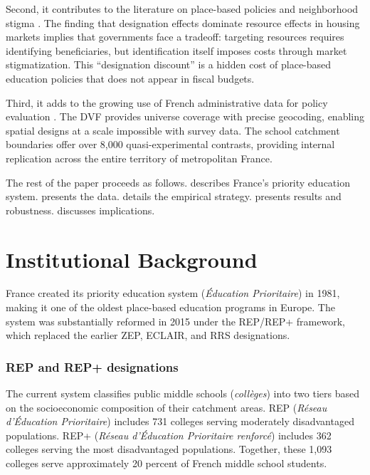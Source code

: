 \documentclass[12pt]{article}
\begin{document}
Second, it contributes to the literature on place-based policies and neighborhood stigma \citep{kain1968, galster2010, moulton2020}. The finding that designation effects dominate resource effects in housing markets implies that governments face a tradeoff: targeting resources requires identifying beneficiaries, but identification itself imposes costs through market stigmatization. This ``designation discount'' is a hidden cost of place-based education policies that does not appear in fiscal budgets.

Third, it adds to the growing use of French administrative data for policy evaluation \citep{fack2010, avvisati2014}. The DVF provides universe coverage with precise geocoding, enabling spatial designs at a scale impossible with survey data. The school catchment boundaries offer over 8,000 quasi-experimental contrasts, providing internal replication across the entire territory of metropolitan France.

The rest of the paper proceeds as follows.  describes France's priority education system.  presents the data.  details the empirical strategy.  presents results and robustness.  discusses implications.


\section{Institutional Background}
\label{sec:background}

France created its priority education system (\textit{\'{E}ducation Prioritaire}) in 1981, making it one of the oldest place-based education programs in Europe. The system was substantially reformed in 2015 under the REP/REP+ framework, which replaced the earlier ZEP, ECLAIR, and RRS designations.

\subsubsection*{REP and REP+ designations} The current system classifies public middle schools (\textit{coll\`{e}ges}) into two tiers based on the socioeconomic composition of their catchment areas. REP (\textit{R\'{e}seau d'\'{E}ducation Prioritaire}) includes 731 colleges serving moderately disadvantaged populations. REP+ (\textit{R\'{e}seau d'\'{E}ducation Prioritaire renforc\'{e}}) includes 362 colleges serving the most disadvantaged populations. Together, these 1,093 colleges serve approximately 20 percent of French middle school students.
\end{document}
